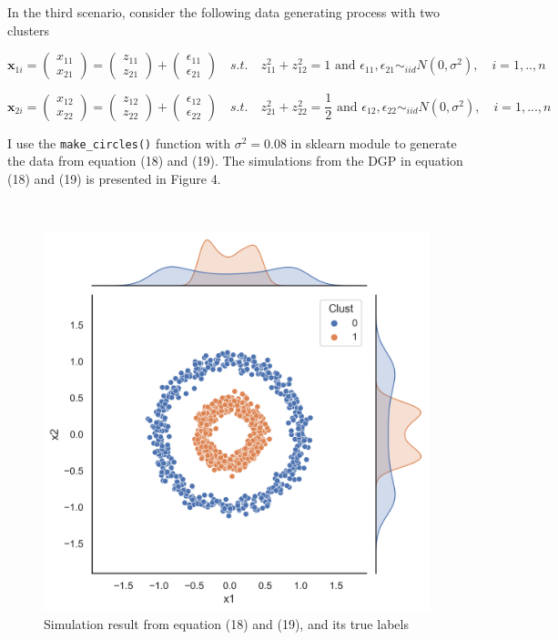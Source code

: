 \documentclass[a4paper]{article}
\begin{document}
In the third scenario, consider the following data generating process with two clusters

\begin{equation}
	\boldsymbol{x}_{1i} = 
	\begin{pmatrix}
		x_{11} \\
		x_{21}
	\end{pmatrix}  = 
	\begin{pmatrix}
		z_{11} \\
		z_{21}
	\end{pmatrix} + 
	\begin{pmatrix}
		\epsilon_{11} \\
		\epsilon_{21}
	\end{pmatrix}
	 \quad s.t. \quad 
	z_{11}^2 + z_{12}^2 = 1 \mbox{ and }
	\epsilon_{11}, \epsilon_{21} \sim_{iid} N(0, \sigma^2), \quad i = 1,..,n
\end{equation}

\begin{equation} 
	\boldsymbol{x}_{2i} = 
	\begin{pmatrix}
		x_{12} \\
		x_{22}
	\end{pmatrix}  = 
	\begin{pmatrix}
		z_{12} \\
		z_{22}
	\end{pmatrix} + 
	\begin{pmatrix}
		\epsilon_{12} \\
		\epsilon_{22}
	\end{pmatrix}
	 \quad s.t. \quad 
	z_{21}^2 + z_{22}^2 = \frac{1}{2} \mbox{ and }
	\epsilon_{12}, \epsilon_{22} \sim_{iid} N(0, \sigma^2), \quad i = 1,...,n
\end{equation}

I use the \texttt{make\_circles()} function with $\sigma^2 = 0.08$ in sklearn module to generate the data from equation (18) and (19). The simulations from the DGP in equation (18) and (19) is presented in Figure 4.

\

\begin{figure}[h!]
  \centering
  \includegraphics[width=0.45\linewidth]{../Simu_results/sen3.png}
  \caption{Simulation result from equation (18) and (19), and its true labels}
  \label{fig:sec}
\end{figure}
\end{document}
